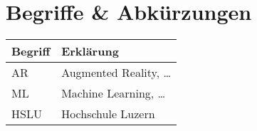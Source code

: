 \section*{Begriffe \& Abkürzungen}
\begin{table}
	\begin{tabular}{p{} p{}}
		\hline
		\textbf{Begriff} & \textbf{Erklärung} \\
		\hline
		AR 		& Augmented Reality, … \\
		ML		& Machine Learning, … \\
		HSLU	& Hochschule Luzern \\
		\hline
	\end{tabular}
\end{table}
